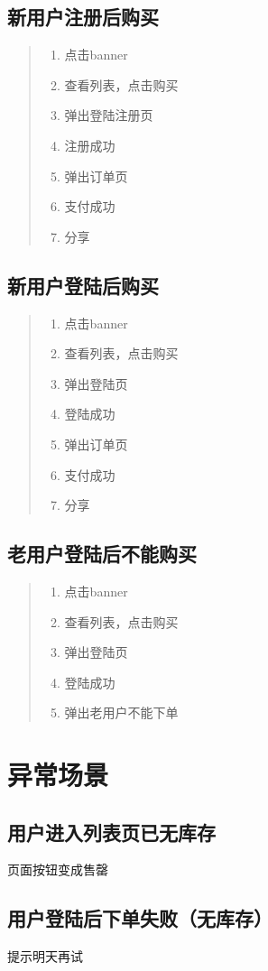 \documentclass[presentation, bigger]{beamer}
\begin{document}
\subsection{新用户注册后购买}
\label{sec:orgheadline7}
\begin{quote}
\begin{enumerate}
\item 点击banner
\item 查看列表，点击购买
\item 弹出登陆注册页
\item 注册成功
\item 弹出订单页
\item 支付成功
\item 分享
\end{enumerate}
\end{quote}

\subsection{新用户登陆后购买}
\label{sec:orgheadline8}
\begin{quote}
\begin{enumerate}
\item 点击banner
\item 查看列表，点击购买
\item 弹出登陆页
\item 登陆成功
\item 弹出订单页
\item 支付成功
\item 分享
\end{enumerate}
\end{quote}

\subsection{老用户登陆后不能购买}
\label{sec:orgheadline9}
\begin{quote}
\begin{enumerate}
\item 点击banner
\item 查看列表，点击购买
\item 弹出登陆页
\item 登陆成功
\item 弹出老用户不能下单
\end{enumerate}
\end{quote}

\section{异常场景}
\label{sec:orgheadline13}
\subsection{用户进入列表页已无库存}
\label{sec:orgheadline11}

页面按钮变成售罄

\subsection{用户登陆后下单失败（无库存）}
\label{sec:orgheadline12}

提示明天再试
\end{document}
